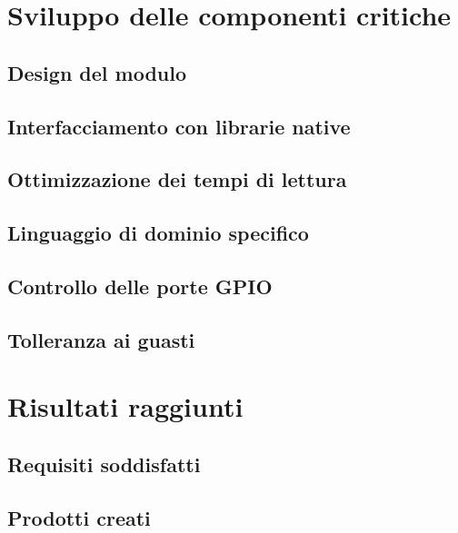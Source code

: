 
\section{Sviluppo delle componenti critiche}
\subsection{Design del modulo}
\subsection{Interfacciamento con librarie native}
\subsection{Ottimizzazione dei tempi di lettura}
\subsection{Linguaggio di dominio specifico}
\subsection{Controllo delle porte GPIO}
\subsection{Tolleranza ai guasti}


\section{Risultati raggiunti}
\subsection{Requisiti soddisfatti}
\subsection{Prodotti creati}